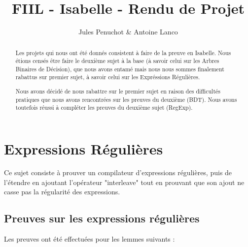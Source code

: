 \documentclass{article}
\title{FIIL - Isabelle - Rendu de Projet}
\author{Jules Penuchot \& Antoine Lanco}
\begin{document}
\maketitle

\begin{abstract}

Les projets qui nous ont été donnés consistent à faire de la preuve en Isabelle. Nous étions censés être faire le deuxième sujet à la base (à savoir celui sur les Arbres Binaires de Décision), que nous avons entamé mais nous nous sommes finalement rabattus sur premier sujet, à savoir celui sur les Expréssions Régulières.

Nous avons décidé de nous rabattre sur le premier sujet en raison des difficultés pratiques que nous avons rencontrées sur les preuves du deuxième (BDT). Nous avons toutefois réussi à compléter les preuves du deuxième sujet (RegExp).

\end{abstract}

\section{Expressions Régulières}

Ce sujet consiste à prouver un compilateur d'expressions régulières, puis de l'étendre en ajoutant l'opérateur "interleave" tout en prouvant que son ajout ne casse pas la régularité des expressions.

\subsection{Preuves sur les expressions régulières}

Les preuves ont été effectuées pour les lemmes suivants :
\end{document}
